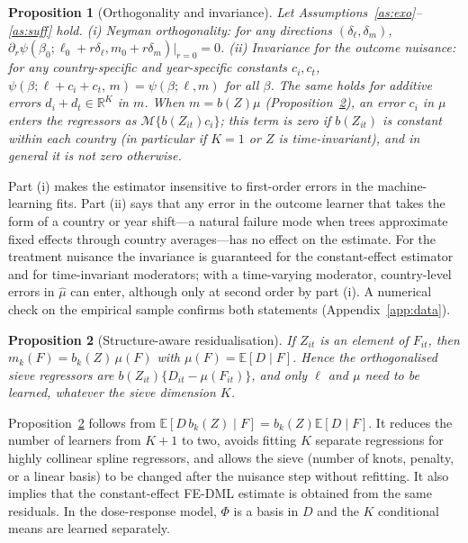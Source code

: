 \documentclass[pdflatex,sn-basic]{sn-jnl}%
\theoremstyle{thmstyleone}
\newtheorem{proposition}{Proposition}
\theoremstyle{thmstyletwo}
\newcommand{\E}{\mathbb{E}}
\newcommand{\M}{\mathcal{M}}
\begin{document}
\begin{proposition}[Orthogonality and invariance]\label{prop:orth}
Let Assumptions~\ref{as:exo}--\ref{as:suff} hold.
(i) \emph{Neyman orthogonality:} for any directions $(\delta_\ell,\delta_m)$, $\partial_r\psi(\beta_0;\ell_0+r\delta_\ell,m_0+r\delta_m)\big|_{r=0}=0$.
(ii) \emph{Invariance for the outcome nuisance:} for any country-specific and year-specific constants $c_i,c_t$, $\psi(\beta;\ell+c_i+c_t,\,m)=\psi(\beta;\ell,m)$ for all $\beta$. The same holds for additive errors $d_i+d_t\in\mathbb{R}^K$ in $m$. When $m=b(Z)\mu$ (Proposition~\ref{prop:struct}), an error $c_i$ in $\mu$ enters the regressors as $\M\{b(Z_{it})c_i\}$; this term is zero if $b(Z_{it})$ is constant within each country (in particular if $K=1$ or $Z$ is time-invariant), and in general it is not zero otherwise.
\end{proposition}

Part (i) makes the estimator insensitive to first-order errors in the machine-learning fits. Part (ii) says that any error in the outcome learner that takes the form of a country or year shift---a natural failure mode when trees approximate fixed effects through country averages---has no effect on the estimate. For the treatment nuisance the invariance is guaranteed for the constant-effect estimator and for time-invariant moderators; with a time-varying moderator, country-level errors in $\hat\mu$ can enter, although only at second order by part (i). A numerical check on the empirical sample confirms both statements (Appendix~\ref{app:data}).

\begin{proposition}[Structure-aware residualisation]\label{prop:struct}
If $Z_{it}$ is an element of $F_{it}$, then $m_k(F)=b_k(Z)\,\mu(F)$ with $\mu(F)=\E[D\mid F]$. Hence the orthogonalised sieve regressors are $b(Z_{it})\{D_{it}-\mu(F_{it})\}$, and only $\ell$ and $\mu$ need to be learned, whatever the sieve dimension $K$.
\end{proposition}

Proposition~\ref{prop:struct} follows from $\E[D\,b_k(Z)\mid F]=b_k(Z)\E[D\mid F]$. It reduces the number of learners from $K+1$ to two, avoids fitting $K$ separate regressions for highly collinear spline regressors, and allows the sieve (number of knots, penalty, or a linear basis) to be changed after the nuisance step without refitting. It also implies that the constant-effect FE-DML estimate is obtained from the same residuals. In the dose-response model, $\Phi$ is a basis in $D$ and the $K$ conditional means are learned separately.
\end{document}

